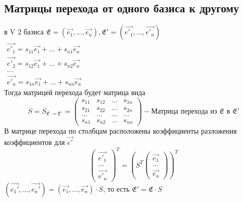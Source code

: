 \subsection{Матрицы перехода от одного базиса к другому}
в V 2 базиса \(\mathfrak{E} = (\vec{e_1},\ldots,\vec{e_n}), \mathfrak{E}' = (\vec{e'_1}, \ldots, \vec{e'_n})\)\\
\(\begin{gathered}
	\vec{e'_1} = s_{11}\vec{e_1}+\ldots+s_{n1}\vec{e_n} \\
	\vec{e'_2} = s_{12}\vec{e_1}+\ldots+s_{n2}\vec{e_n} \\
	\ldots \\
	\vec{e'_n} = s_{1n}\vec{e_1}+\ldots+s_{nn}\vec{e_n} 
\end{gathered}\)\\ Тогда матрицей перехода будет матрица вида 
\[S = S_{\mathfrak{E}\to\mathfrak{E}'} = \begin{pmatrix}
	s_{11} & s_{12} & \ldots & s_{1n} \\
	s_{21} & s_{22} & \ldots & s_{2n} \\
	\ldots & \ldots & \ldots & \ldots \\
	s_{n1} & s_{n2} & \ldots & s_{nn}
\end{pmatrix} - \text{Матрица перехода из $\mathfrak{E}$ в $\mathfrak{E}'$}\]
В матрице перехода по столбцам расположены коэффициенты разложения коэффициентов для $\vec{e'}$
\[\begin{pmatrix}
	\vec{e'_1} \\ \ldots \\ \vec{e'_n}
\end{pmatrix}^T = \left(S^T\begin{pmatrix}
\vec{e_1} \\ \ldots \\ \vec{e_n}
\end{pmatrix}\right)^T\] 
\((\vec{e_1'}, \ldots, \vec{e_n'}) = (\vec{e_1}, \ldots, \vec{e_n})\cdot S\), то есть \(\mathfrak{E'} = \mathfrak{E}\cdot S\)
